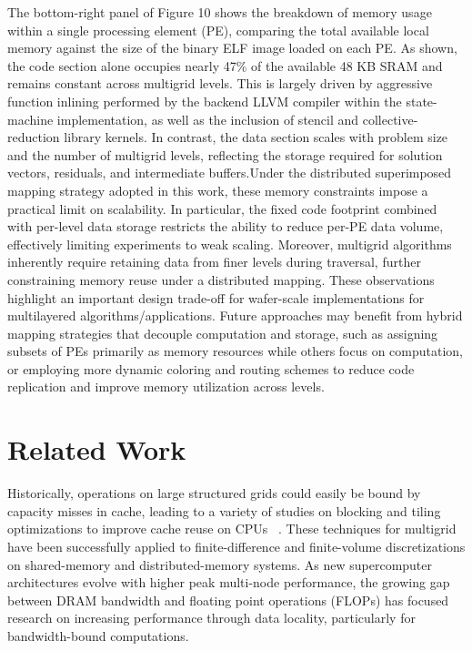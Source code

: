 \documentclass[sigconf]{acmart}
\begin{document}
    The bottom-right panel of Figure 10 shows the breakdown of memory usage within a single processing element (PE), comparing the total available local memory against the size of the binary ELF image loaded on each PE. As shown, the code section alone occupies nearly 47\% of the available 48 KB SRAM and remains constant across multigrid levels. This is largely driven by aggressive function inlining performed by the backend LLVM compiler within the state-machine implementation, as well as the inclusion of stencil and collective-reduction library kernels. In contrast, the data section scales with problem size and the number of multigrid levels, reflecting the storage required for solution vectors, residuals, and intermediate buffers.Under the distributed superimposed mapping strategy adopted in this work, these memory constraints impose a practical limit on scalability. In particular, the fixed code footprint combined with per-level data storage restricts the ability to reduce per-PE data volume, effectively limiting experiments to weak scaling. Moreover, multigrid algorithms inherently require retaining data from finer levels during traversal, further constraining memory reuse under a distributed mapping.
    These observations highlight an important design trade-off for wafer-scale implementations for multilayered algorithms/applications. %
    Future approaches may benefit from hybrid mapping strategies that decouple computation and storage, such as assigning subsets of PEs primarily as memory resources while others focus on computation, or employing more dynamic coloring and routing schemes to reduce code replication and improve memory utilization across levels.

\section{Related Work}
Historically, operations on large structured grids could easily be bound by capacity misses in cache, leading to a variety of studies on blocking and tiling optimizations to improve cache reuse on CPUs%
~\cite{Nguyen:2010:BOS:1884643.1884658,Zhou:2012,Yount:2016:YSK:3019129.3019133,Unat2016,Devito}. These techniques for multigrid have been successfully applied to finite-difference and finite-volume discretizations on shared-memory and distributed-memory systems.
As new supercomputer architectures evolve with higher peak multi-node performance, the growing gap between DRAM bandwidth and floating point operations (FLOPs) has focused research on increasing performance through data locality, particularly for bandwidth-bound computations.
\end{document}
